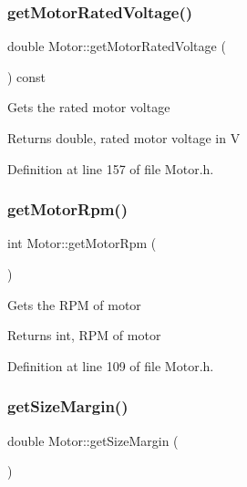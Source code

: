 \subsubsection{\texorpdfstring{get\+Motor\+Rated\+Voltage()}{getMotorRatedVoltage()}}
{\footnotesize\ttfamily double Motor\+::get\+Motor\+Rated\+Voltage (\begin{DoxyParamCaption}{ }\end{DoxyParamCaption}) const\hspace{0.3cm}{\ttfamily [inline]}}

Gets the rated motor voltage \begin{DoxyReturn}{Returns}
double, rated motor voltage in V 
\end{DoxyReturn}


Definition at line 157 of file Motor.\+h.

\mbox{\label{class_motor_a13826c93b894d699478e34a98ffb35ab}} 
\subsubsection{\texorpdfstring{get\+Motor\+Rpm()}{getMotorRpm()}}
{\footnotesize\ttfamily int Motor\+::get\+Motor\+Rpm (\begin{DoxyParamCaption}{ }\end{DoxyParamCaption})\hspace{0.3cm}{\ttfamily [inline]}}

Gets the R\+PM of motor \begin{DoxyReturn}{Returns}
int, R\+PM of motor 
\end{DoxyReturn}


Definition at line 109 of file Motor.\+h.

\mbox{\label{class_motor_aff485f55bed5b58d1454ce5c71bc0729}} 
\subsubsection{\texorpdfstring{get\+Size\+Margin()}{getSizeMargin()}}
{\footnotesize\ttfamily double Motor\+::get\+Size\+Margin (\begin{DoxyParamCaption}{ }\end{DoxyParamCaption})\hspace{0.3cm}{\ttfamily [inline]}}

